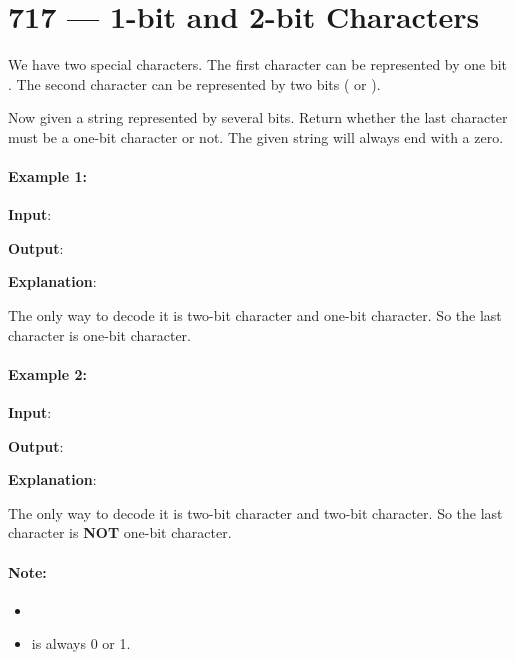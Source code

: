 \section{717 --- 1-bit and 2-bit Characters}
We have two special characters. The first character can be represented by one bit . The second character can be represented by two bits ( or ).

Now given a string represented by several bits. Return whether the last character must be a one-bit character or not. The given string will always end with a zero.

\paragraph{Example 1:}

\begin{flushleft}
\textbf{Input}: 

\textbf{Output}: 

\textbf{Explanation}: 

The only way to decode it is two-bit character and one-bit character. So the last character is one-bit character.
\end{flushleft}

\paragraph{Example 2:}
\begin{flushleft}


\textbf{Input}: 

\textbf{Output}: 

\textbf{Explanation}: 

The only way to decode it is two-bit character and two-bit character. So the last character is \textbf{NOT} one-bit character.

\end{flushleft}


\paragraph{Note:}

\begin{itemize}
\item {}
\item {} is always 0 or 1.
\end{itemize}

